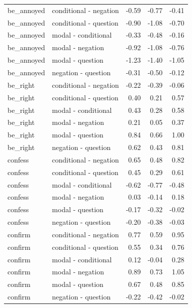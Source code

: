 \documentclass[a4paper,12pt,twoside]{article}
\begin{document}
\begin{longtable}{llrrr}
      be\_annoyed & conditional - negation & -0.59 & -0.77 & -0.41 \\ 
      be\_annoyed & conditional - question & -0.90 & -1.08 & -0.70 \\ 
      be\_annoyed & modal - conditional & -0.33 & -0.48 & -0.16 \\ 
      be\_annoyed & modal - negation & -0.92 & -1.08 & -0.76 \\ 
      be\_annoyed & modal - question & -1.23 & -1.40 & -1.05 \\ 
      be\_annoyed & negation - question & -0.31 & -0.50 & -0.12 \\ \midrule
      
      be\_right & conditional - negation & -0.22 & -0.39 & -0.06 \\ 
      be\_right & conditional - question & 0.40 & 0.21 & 0.57 \\ 
      be\_right & modal - conditional & 0.43 & 0.28 & 0.58 \\ 
      be\_right & modal - negation & 0.21 & 0.05 & 0.37 \\ 
      be\_right & modal - question & 0.84 & 0.66 & 1.00 \\ 
      be\_right & negation - question & 0.62 & 0.43 & 0.81 \\ \midrule
      
      confess & conditional - negation & 0.65 & 0.48 & 0.82 \\ 
      confess & conditional - question & 0.45 & 0.29 & 0.61 \\ 
      confess & modal - conditional & -0.62 & -0.77 & -0.48 \\ 
      confess & modal - negation & 0.03 & -0.14 & 0.18 \\ 
      confess & modal - question & -0.17 & -0.32 & -0.02 \\ 
      confess & negation - question & -0.20 & -0.38 & -0.03 \\ \midrule
      
      confirm & conditional - negation & 0.77 & 0.59 & 0.95 \\ 
      confirm & conditional - question & 0.55 & 0.34 & 0.76 \\ 
      confirm & modal - conditional & 0.12 & -0.04 & 0.28 \\ 
      confirm & modal - negation & 0.89 & 0.73 & 1.05 \\ 
      confirm & modal - question & 0.67 & 0.48 & 0.85 \\ 
      confirm & negation - question & -0.22 & -0.42 & -0.02 \\ \midrule


\end{longtable}
\end{document}

